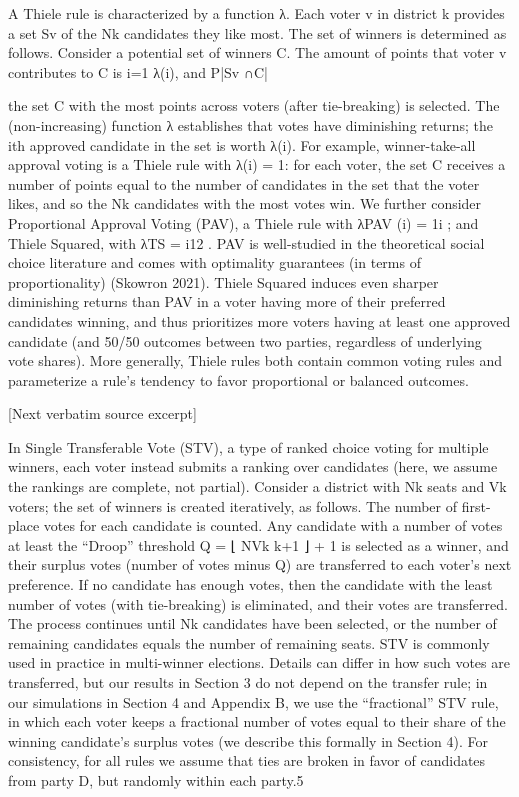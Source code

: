 \documentclass[10pt]{article}
\begin{document}
\begin{ReviewVerbatim}

    A Thiele rule is characterized by a function λ. Each voter v in district k provides a set Sv
of the Nk candidates they like most. The set of winners is determined as follows. Consider a
potential set of winners C. The amount of points that voter v contributes to C is i=1         λ(i), and
                                                                                     P|Sv ∩C|

the set C with the most points across voters (after tie-breaking) is selected. The (non-increasing)
function λ establishes that votes have diminishing returns; the ith approved candidate in the set is
worth λ(i). For example, winner-take-all approval voting is a Thiele rule with λ(i) = 1: for each
voter, the set C receives a number of points equal to the number of candidates in the set that the
voter likes, and so the Nk candidates with the most votes win. We further consider Proportional
Approval Voting (PAV), a Thiele rule with λPAV (i) = 1i ; and Thiele Squared, with λTS = i12 . PAV
is well-studied in the theoretical social choice literature and comes with optimality guarantees (in
terms of proportionality) (Skowron 2021). Thiele Squared induces even sharper diminishing returns
than PAV in a voter having more of their preferred candidates winning, and thus prioritizes more
voters having at least one approved candidate (and 50/50 outcomes between two parties, regardless
of underlying vote shares). More generally, Thiele rules both contain common voting rules and
parameterize a rule’s tendency to favor proportional or balanced outcomes.

[Next verbatim source excerpt]

    In Single Transferable Vote (STV), a type of ranked choice voting for multiple winners, each
voter instead submits a ranking over candidates (here, we assume the rankings are complete, not
partial). Consider a district with Nk seats and Vk voters; the set of winners is created iteratively, as
follows. The number of first-place votes for each candidate is counted. Any candidate with a number
of votes at least the “Droop” threshold Q = ⌊ NVk k+1 ⌋ + 1 is selected as a winner, and their surplus
votes (number of votes minus Q) are transferred to each voter’s next preference. If no candidate has
enough votes, then the candidate with the least number of votes (with tie-breaking) is eliminated,
and their votes are transferred. The process continues until Nk candidates have been selected, or
the number of remaining candidates equals the number of remaining seats. STV is commonly used
in practice in multi-winner elections.
    Details can differ in how such votes are transferred, but our results in Section 3 do not depend
on the transfer rule; in our simulations in Section 4 and Appendix B, we use the “fractional” STV
rule, in which each voter keeps a fractional number of votes equal to their share of the winning
candidate’s surplus votes (we describe this formally in Section 4). For consistency, for all rules we
assume that ties are broken in favor of candidates from party D, but randomly within each party.5
\end{ReviewVerbatim}
\end{document}
